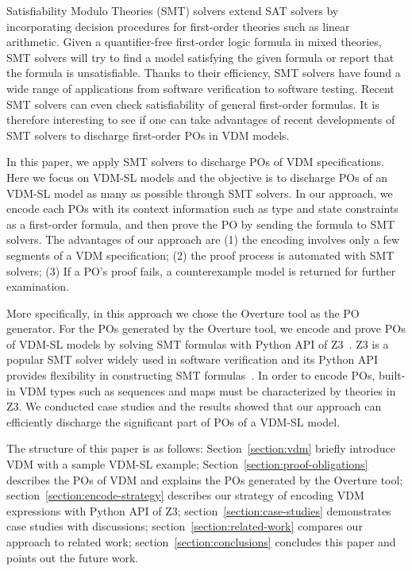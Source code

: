 Satisfiability Modulo Theories (SMT) solvers extend SAT solvers by incorporating decision procedures for first-order theories such as linear arithmetic. Given a quantifier-free first-order logic formula in mixed theories, SMT solvers will try to find a model satisfying the given formula or report that the formula is unsatisfiable. Thanks to their efficiency, SMT solvers have found a wide range of applications from software verification to software testing. Recent SMT solvers can even check satisfiability of general first-order formulas. It is therefore interesting to see if one can take advantages of recent developments of SMT solvers to discharge first-order POs in VDM models. 


In this paper, we apply SMT solvers to discharge POs of VDM specifications. Here we focus on VDM-SL models and the objective is to discharge POs of an VDM-SL model as many as possible through SMT solvers. In our approach, we encode each POs with its context information such as type and state constraints as a first-order formula, and then prove the PO by sending the formula to SMT solvers. The advantages of our approach are (1) the encoding involves only a few segments of a VDM specification; (2) the proof process is automated with SMT solvers; (3) If a PO's proof fails, a counterexample model is returned for further examination. 

More specifically, in this approach we chose the Overture tool as the PO generator. For the POs generated by the Overture tool, we encode and prove POs of VDM-SL models by solving SMT formulas with Python API of Z3~\cite{MB:08:ZSS}. Z3 is a popular SMT solver widely used in software verification and its Python API provides flexibility in constructing SMT formulas~\cite{BarFT-SMTLIB}. In order to encode POs, built-in VDM types such as sequences and maps must be characterized by theories in Z3. We conducted case studies and the results showed that our approach can efficiently discharge the significant part of POs of a VDM-SL model.

The structure of this paper is as follows: Section~\ref{section:vdm} briefly introduce VDM with a sample VDM-SL example; Section~\ref{section:proof-obligations} describes the POs of VDM and explains the POs generated by the Overture tool; section~\ref{section:encode-strategy} describes our strategy of encoding VDM expressions with Python API of Z3; section~\ref{section:case-studies} demonstrates case studies with discussions; section~\ref{section:related-work} compares our approach to related work; section~\ref{section:conclusions} concludes this paper and points out the future work.

